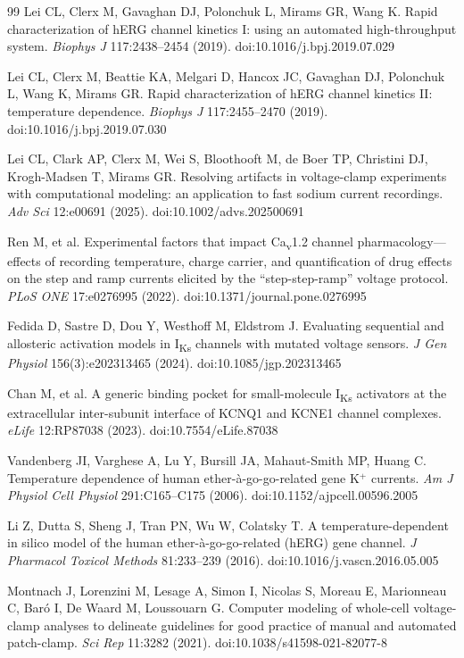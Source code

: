 \documentclass[11pt,a4paper]{article}
\begin{document}
\begin{thebibliography}{99}
 Lei CL, Clerx M, Gavaghan DJ, Polonchuk L, Mirams GR, Wang K.
Rapid characterization of hERG channel kinetics I: using an automated
high-throughput system. \emph{Biophys J} 117:2438--2454 (2019).
doi:10.1016/j.bpj.2019.07.029

 Lei CL, Clerx M, Beattie KA, Melgari D, Hancox JC,
Gavaghan DJ, Polonchuk L, Wang K, Mirams GR. Rapid characterization of hERG
channel kinetics II: temperature dependence. \emph{Biophys J} 117:2455--2470
(2019). doi:10.1016/j.bpj.2019.07.030

 Lei CL, Clark AP, Clerx M, Wei S, Bloothooft M, de Boer TP,
Christini DJ, Krogh-Madsen T, Mirams GR. Resolving artifacts in voltage-clamp
experiments with computational modeling: an application to fast sodium current
recordings. \emph{Adv Sci} 12:e00691 (2025). doi:10.1002/advs.202500691

 Ren M, et al. Experimental factors that impact
Ca\textsubscript{v}1.2 channel pharmacology---effects of recording temperature,
charge carrier, and quantification of drug effects on the step and ramp
currents elicited by the ``step-step-ramp'' voltage protocol. \emph{PLoS ONE}
17:e0276995 (2022). doi:10.1371/journal.pone.0276995

 Fedida D, Sastre D, Dou Y, Westhoff M, Eldstrom J.
Evaluating sequential and allosteric activation models in I\textsubscript{Ks}
channels with mutated voltage sensors. \emph{J Gen Physiol} 156(3):e202313465
(2024). doi:10.1085/jgp.202313465

 Chan M, et al. A generic binding pocket for small-molecule
I\textsubscript{Ks} activators at the extracellular inter-subunit interface of
KCNQ1 and KCNE1 channel complexes. \emph{eLife} 12:RP87038 (2023).
doi:10.7554/eLife.87038

 Vandenberg JI, Varghese A, Lu Y, Bursill JA,
Mahaut-Smith MP, Huang C. Temperature dependence of human
ether-\`a-go-go-related gene K$^+$ currents. \emph{Am J Physiol Cell Physiol}
291:C165--C175 (2006). doi:10.1152/ajpcell.00596.2005

 Li Z, Dutta S, Sheng J, Tran PN, Wu W, Colatsky T. A
temperature-dependent in silico model of the human ether-\`a-go-go-related
(hERG) gene channel. \emph{J Pharmacol Toxicol Methods} 81:233--239 (2016).
doi:10.1016/j.vascn.2016.05.005

 Montnach J, Lorenzini M, Lesage A, Simon I, Nicolas S,
Moreau E, Marionneau C, Bar\'o I, De Waard M, Loussouarn G. Computer modeling of
whole-cell voltage-clamp analyses to delineate guidelines for good practice of
manual and automated patch-clamp. \emph{Sci Rep} 11:3282 (2021).
doi:10.1038/s41598-021-82077-8

\end{thebibliography}
\end{document}
